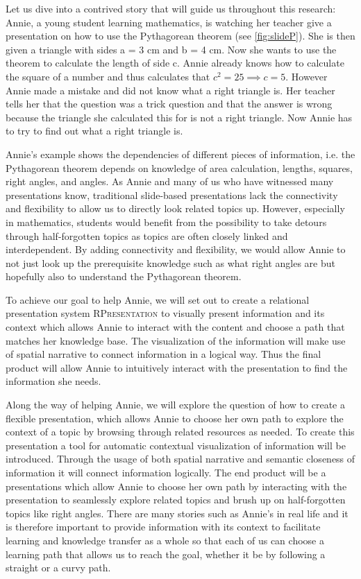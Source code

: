 \documentclass{llncs}
\newcommand{\sys}{\textsc{RPresentation}\xspace}
\begin{document}
Let us dive into a contrived story that will guide us throughout this research: Annie, a young student learning mathematics, is watching her teacher give a presentation on how to use the Pythagorean theorem (see \autoref{fig:slideP}). She is then given a triangle with sides a = 3 cm and b = 4 cm. Now she wants to use the theorem to calculate the length of side c. Annie already knows how to calculate the square of a number and thus calculates that $c^2 = 25 \implies c = 5$. However Annie made a mistake and did not know what a right triangle is. Her teacher tells her that the question was a trick question and that the answer is wrong because the triangle she calculated this for is not a right triangle. Now Annie has to try to find out what a right triangle is.

Annie's example shows the dependencies of different pieces of information, i.e. the Pythagorean theorem depends on knowledge of area calculation, lengths, squares, right angles, and angles. As Annie and many of us who have witnessed many presentations know, traditional slide-based presentations lack the connectivity and flexibility to allow us to directly look related topics up. However, especially in mathematics, students would benefit from the possibility to take detours through half-forgotten topics as topics are often closely linked and interdependent. By adding connectivity and flexibility, we would allow Annie to not just look up the prerequisite knowledge such as what right angles are but hopefully also to understand the Pythagorean theorem.

To achieve our goal to help Annie, we will set out to create a relational presentation system \sys to visually present information and its context which allows Annie to interact with the content and choose a path that matches her knowledge base. The visualization of the information will make use of spatial narrative to connect information in a logical way. Thus the final product will allow Annie to intuitively interact with the presentation to find the information she needs.

Along the way of helping Annie, we will explore the question of how to create a flexible presentation, which allows Annie to choose her own path to explore the context of a topic by browsing through related resources as needed. To create this presentation a tool for automatic contextual visualization of information will be introduced. Through the usage of both spatial narrative and semantic closeness of information it will connect information logically. The end product will be a presentations which allow Annie to choose her own path by interacting with the presentation to seamlessly explore related topics and brush up on half-forgotten topics like right angles. There are many stories such as Annie's in real life and it is therefore important to provide information with its context to facilitate learning and knowledge transfer as a whole so that each of us can choose a learning path that allows us to reach the goal, whether it be by following a straight or a curvy path.
\end{document}
